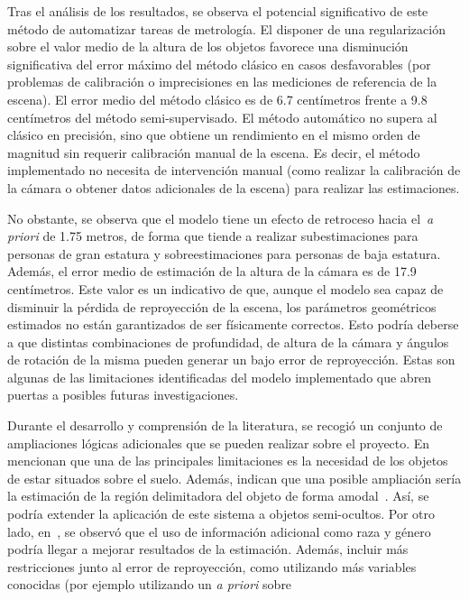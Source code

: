 Tras el análisis de los resultados, se observa el potencial significativo de este método
de automatizar tareas de metrología. El disponer de una regularización sobre el valor medio
de la altura de los objetos favorece una disminución significativa del error máximo del
método clásico en casos desfavorables (por problemas de calibración o imprecisiones en
las mediciones de referencia de la escena). El error medio del método clásico es de 6.7 centímetros
frente a 9.8 centímetros del método semi-supervisado. El método automático no supera
al clásico en precisión, sino que obtiene un rendimiento en el mismo orden de magnitud sin requerir
calibración manual de la escena. Es decir, el método implementado no
necesita de intervención manual (como realizar la calibración de la cámara o obtener datos
adicionales de la escena) para realizar las estimaciones.
\par
No obstante, se observa que el modelo tiene un efecto de retroceso hacia el~\emph{a priori} de 1.75 metros,
de forma que tiende a realizar subestimaciones para personas de gran estatura y sobreestimaciones para personas de baja estatura.
Además, el error medio de estimación de la altura de la cámara es de 17.9 centímetros.
Este valor es un indicativo de que, aunque el modelo sea capaz de disminuir la pérdida de
reproyección de la escena, los parámetros geométricos estimados no están garantizados de ser
físicamente correctos. Esto podría deberse a que distintas combinaciones de profundidad,
de altura de la cámara y ángulos de rotación de la misma pueden generar un
bajo error de reproyección. Estas son algunas de las limitaciones identificadas del modelo
implementado que abren puertas a posibles futuras investigaciones.
\par
Durante el desarrollo y comprensión de la literatura, se recogió un conjunto de ampliaciones
lógicas adicionales que se pueden realizar sobre el proyecto.
En~\cite{SVMIW} mencionan que una de las principales limitaciones es la necesidad de los objetos de estar situados sobre el suelo.
Además, indican que una posible ampliación sería la estimación de la
región delimitadora del objeto de forma amodal~\cite{kar2015amodalcompletionsizeconstancy}.
Así, se podría extender la aplicación de este sistema a objetos semi-ocultos.
Por otro lado, en~\cite{SAKINA2024765}, se observó que el uso de información adicional como raza y género podría llegar
a mejorar resultados de la estimación. Además, incluir más restricciones junto al error
de reproyección, como utilizando más variables conocidas (por ejemplo utilizando un \emph{a priori} sobre
